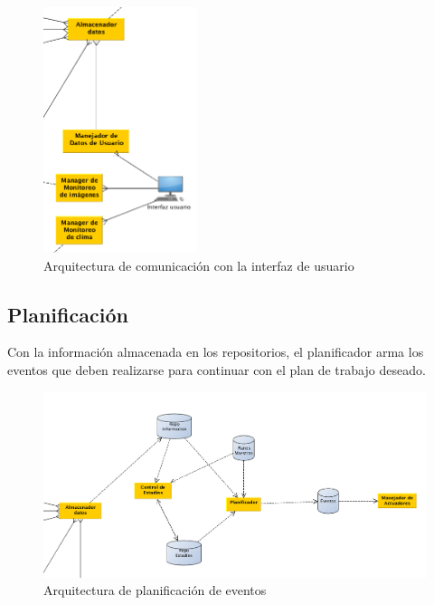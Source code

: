 \begin{figure}[h!]
  \centering
  \includegraphics[width=0.4\textwidth]{./images/arq_interfazusuario.png}
  \caption{Arquitectura de comunicaci\'on con la interfaz de usuario}
  \label{fig:clases4}
\end{figure}

\subsection{Planificaci\'on}

Con la informaci\'on almacenada en los repositorios, el planificador arma los eventos que deben realizarse para continuar con el plan de trabajo deseado.

\begin{figure}[h!]
  \centering
  \includegraphics[width=1\textwidth]{./images/arq_plan.png}
  \caption{Arquitectura de planificaci\'on de eventos}
  \label{fig:clases4}
\end{figure}